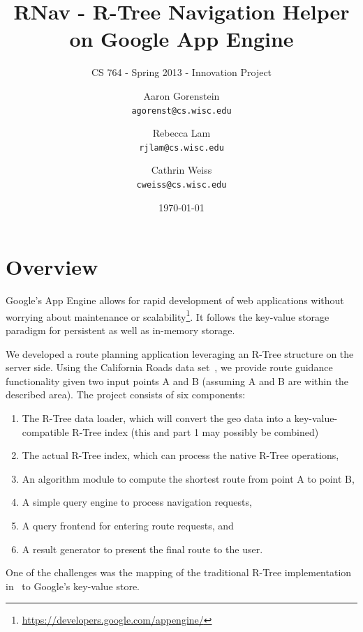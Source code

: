 \documentclass{scrartcl}
\newcommand{\email}[1]{\texttt{#1}}
\begin{document}
\title{RNav - R-Tree Navigation Helper on Google App Engine}
\subtitle{CS 764 - Spring 2013 - Innovation Project}

\author{
Aaron Gorenstein\\
	\email{agorenst@cs.wisc.edu}
\and
Rebecca Lam\\
	\email{rjlam@cs.wisc.edu}
\and
Cathrin Weiss\\
	\email{cweiss@cs.wisc.edu}       
}

\date{\today}

\maketitle

\section{Overview}
\label{sec:intro}
Google's App Engine allows for rapid development of web applications without worrying about maintenance or scalability\footnote{\url{https://developers.google.com/appengine/}}. It follows the key-value storage paradigm for persistent as well as in-memory storage.

We developed a route planning application leveraging an R-Tree structure on the server side. Using the California Roads data set~\cite{Online:cardata}, we provide route guidance functionality given two input points A and B (assuming A and B are within the described area). The project consists of six components:
\begin{enumerate}
\item The R-Tree data loader, which will convert the geo data into a key-value-compatible R-Tree index (this and part 1 may possibly be combined)
\item The actual R-Tree index, which can process the native R-Tree operations,
\item An algorithm module to compute the shortest route from point A to point B,
\item A simple query engine to process navigation requests, 
\item A query frontend for entering route requests, and
\item A result generator to present the final route to the user. 
\end{enumerate}
One of the challenges was the mapping of the traditional R-Tree implementation in~\cite{DBLP:conf/sigmod/Guttman84} to Google's key-value store. 
\end{document}
